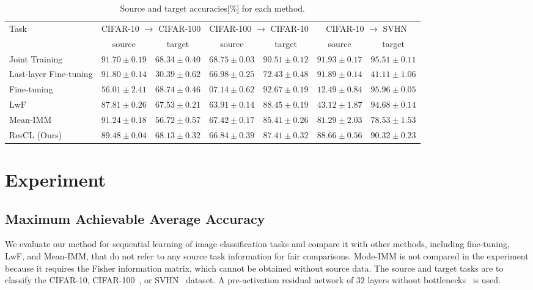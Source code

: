 \documentclass[letterpaper]{article}
\begin{document}
\begin{table}[t]
\centering
\caption{Source and target accuracies[\%] for each method.}\smallskip
\renewcommand{\tabcolsep}{5pt}
\begin{tabular}{|l||c|c|c|c|c|c|}
\hline
\multirow{2}{*}{Task} & \multicolumn{2}{c|}{CIFAR-10 $\rightarrow$ CIFAR-100} & \multicolumn{2}{c|}{CIFAR-100 $\rightarrow$ CIFAR-10} & \multicolumn{2}{c|}{CIFAR-10 $\rightarrow$ SVHN} \\
\cline{2-7}
 & source & target & source & target & source & target \\
\hline\hline
Joint Training & $91.70\pm0.19$ & $68.34\pm0.40$ & $68.75\pm0.03$ & $90.51\pm0.12$ & $91.93\pm0.17$ & $95.51\pm0.11$ \\
\hline
Last-layer Fine-tuning & $91.80\pm0.14$ & $30.39\pm0.62$ & $66.98\pm0.25$ & $72.43\pm0.48$ & $91.89\pm0.14$ & $41.11\pm1.06$ \\
Fine-tuning & $56.01\pm2.41$ & $68.74\pm0.46$ & $07.14\pm0.62$ & $92.67\pm0.19$ & $12.49\pm0.84$ & $95.96\pm0.05$ \\
LwF~\cite{li2018learning} & $87.81\pm0.26$ & $67.53\pm0.21$ & $63.91\pm0.14$ & $88.45\pm0.19$ & $43.12\pm1.87$ & $94.68\pm0.14$ \\
Mean-IMM~\cite{lee2017overcoming} & $91.24\pm0.18$ & $56.72\pm0.57$ & $67.42\pm0.17$ & $85.41\pm0.26$ & $81.29\pm2.03$ & $78.53\pm1.53$ \\
ResCL (Ours) & $89.48\pm0.04$ & $68.13\pm0.32$ & $66.84\pm0.39$ & $87.41\pm0.32$ & $88.66\pm0.56$ & $90.32\pm0.23$ \\
\hline
\end{tabular}
\label{tab:result1-tune-st}
\end{table}







\section{Experiment}
\label{sec:exp}

\subsection{Maximum Achievable Average Accuracy}

We evaluate our method for sequential learning of image classification tasks and compare it with other methods, including fine-tuning, LwF, and Mean-IMM, that do not refer to any source task information for fair comparisons.
Mode-IMM is not compared in the experiment because it requires the Fisher information matrix, which cannot be obtained without source data.
The source and target tasks are to classify the CIFAR-10, CIFAR-100~\cite{krizhevsky2009learning}, or SVHN~\cite{netzer2011reading} dataset. A pre-activation residual network of $32$ layers without bottlenecks~\cite{he2016identity} is used.
\end{document}
